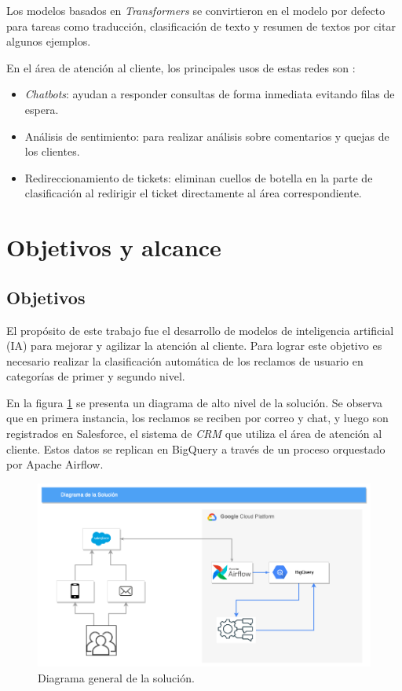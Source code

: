 
Los modelos basados en \textit{Transformers} se convirtieron en el modelo por defecto para tareas como traducción, clasificación de texto y resumen de textos por citar algunos ejemplos.

En el área de atención al cliente, los principales usos de estas redes son \citep{WEBSITE:15}:
\begin{itemize}
\item \textit{Chatbots}: ayudan a responder consultas de forma inmediata evitando filas de espera.
\item Análisis de sentimiento: para realizar análisis sobre comentarios y quejas de los clientes.
\item Redireccionamiento de tickets: eliminan cuellos de botella en la parte de clasificación al redirigir el ticket directamente al área correspondiente.
\end{itemize}


\section{Objetivos y alcance}

\subsection{Objetivos}

El propósito de este trabajo fue el desarrollo de modelos de inteligencia artificial (IA) para mejorar y agilizar la atención al cliente. Para lograr este objetivo es necesario realizar la clasificación automática de los reclamos de usuario en categorías de primer y segundo nivel.

En la figura \ref{fig:diag1} se presenta un diagrama de alto nivel de la solución. Se observa que en primera instancia, los reclamos se reciben por correo y chat, y luego son registrados en Salesforce, el sistema de \textit{CRM} que utiliza el área de atención al cliente. Estos datos se replican en BigQuery a través de un proceso orquestado por Apache Airflow.

\begin{figure}[htbp]
	\centering
	\includegraphics[width=.8\textwidth]{./Figures/solucion1.png}
	\caption{Diagrama general de la solución.}
	\label{fig:diag1}
\end{figure}

